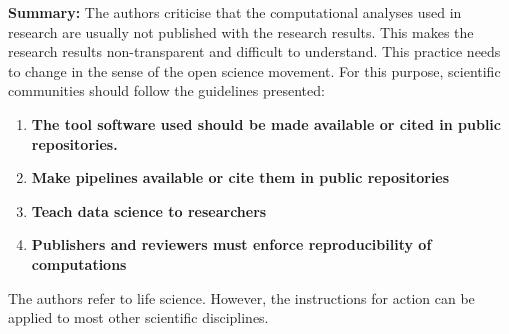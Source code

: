 \documentclass{article}
\begin{document}
\textbf{Summary: }The authors criticise that the computational analyses used in research are usually not published with the research results. This makes the research results non-transparent and difficult to understand. This practice needs to change in the sense of the open science movement. For this purpose, scientific communities should follow the guidelines presented:

\begin{enumerate}
\item \textbf{The tool software used should be made available or cited in public repositories.}


\item \textbf{Make pipelines available or cite them in public repositories}


\item \textbf{Teach data science to researchers}


\item \textbf{Publishers and reviewers must enforce reproducibility of computations}


\end{enumerate}

The authors refer to life science. However, the instructions for action can be applied to most other scientific disciplines.


\printbibliography[title={Bibliography}]
\end{document}
